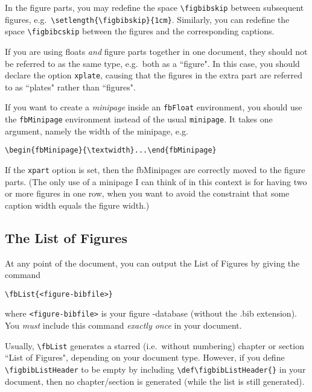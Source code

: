 \documentclass{ltxdoc}
\begin{document}
\DescribeMacro{\figbibskip}
\DescribeMacro{\figbibcskip}
In the figure parts, you may redefine the space
\verb+\figbibskip+ between subsequent figures, e.g.\
\verb+\setlength{\figbibskip}{1cm}+. Similarly, you can
redefine the space \verb+\figbibcskip+  between the figures and
the corresponding captions.

If you are using floats \emph{and} figure parts together in one
document, they should not be referred to as the same type, e.g.\
both as a ``figure". In this case, you should declare the option
\texttt{xplate}, causing that the figures in the extra part are
referred to as ``plates" rather than ``figures".

If you want to create a \emph{minipage} inside an \texttt{fbFloat}
environment, you should use the \texttt{fbMinipage} environment
instead of the usual \texttt{minipage}. It takes one argument,
namely the width of the minipage, e.g.
\begin{verbatim}
\begin{fbMinipage}{\textwidth}...\end{fbMinipage}
\end{verbatim}
If the \texttt{xpart} option is set, then the fbMinipages are
correctly moved to the figure parts. (The only use of a minipage I
can think of in this context is for having two or more figures in
one row, when you want to avoid the constraint that some caption
width equals the figure width.)

\subsection{The List of Figures}

\DescribeMacro{\fbList}
At any point of the document, you can output the List of Figures
by giving the command
\begin{verbatim}
\fbList{<figure-bibfile>}
\end{verbatim}
where \texttt{<figure-bibfile>} is your figure \BibTeX-database
(without the .bib extension). You \emph{must} include this command
\emph{exactly once} in your document.

\DescribeMacro{\figbibListHeader}
Usually, \verb+\fbList+ generates a starred (i.e.\ without
numbering) chapter or section ``List of Figures", depending on
your document type. However, if you define
\verb+\figbibListHeader+ to be empty by including \verb+\def\figbibListHeader{}+
in your document, then no chapter/section is generated (while the
list is still generated).
\end{document}
